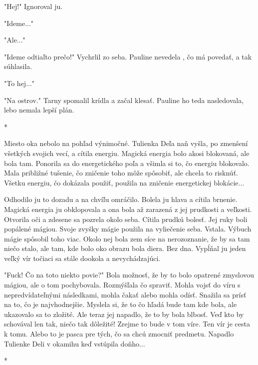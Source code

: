\documentclass{book}
\begin{document}
"$ $Hej!"$ $  Ignoroval ju.

"$ $Ideme..."$ $ 

"$ $Ale..."$ $ 

"$ $Ideme odtiaľto prečo!"$ $  Vychrlil zo seba. Pauline nevedela , čo má povedať, a tak súhlasila.

"$ $To hej..."$ $ 

"$ $Na ostrov."$ $  Tarny spomalil krídla a začal klesať. Pauline ho teda nasledovala, lebo nemala lepší plán.

\begin{center}

*

\end{center}

Miesto oka nebolo na pohľad výnimočné. Tulienka Deľa naň vyšla, po zmenšení všetkých svojich vecí, a cítila energiu. Magická energia bolo akosi blokovaná, ale bola tam. Ponorila sa do energetického poľa a všimla si to, čo energiu blokovalo. Mala približné tušenie, čo zničenie toho môže spôsobiť, ale chcela to risknúť. Všetku energiu, čo dokázala použiť, použila na zničenie energetickej blokácie...

Odhodilo ju to dozadu a na chvíľu omráčilo. Bolela ju hlava a cítila brnenie. Magická energia ju obklopovala a ona bola až zarazená z jej prudkosti a veľkosti. Otvorila oči a zdesene sa pozrela okolo seba. Cítila prudkú bolesť. Jej ruky boli popálené mágiou. Svoje zvyšky mágie použila na vyliečenie seba. Vstala. Výbuch mágie spôsobil toho viac. Okolo nej bola zem síce na nerozoznanie, že by sa tam niečo stalo, ale tam, kde bolo oko obrazu bola diera. Bez dna. Vypĺňal ju jeden veľký vír točiaci sa stále dookola a nevychádzajúci.

"$ $Fuck! Čo na toto niekto povie?"$ $  Bola možnosť, že by to bolo opatrené zmyslovou mágiou, ale o tom pochybovala. Rozmýšľala čo spraviť. Mohla vojsť do víru s nepredvídateľnými následkami, mohla čakať alebo mohla odísť. Snažila sa prísť na to, čo je najvhodnejšie. Myslela si, že to čo hľadá bude tam kde bola, ale ukazovalo sa to zložité. Ale teraz jej napadlo, že to by bola blbosť. Veď kto by schovával len tak, niečo tak dôležité! Zrejme to bude v tom víre. Ten vír je cesta k tomu. Alebo to je pasca pre tých, čo sa chcú zmocniť predmetu. Napadlo Tulienke Deli v okamihu keď vstúpila doňho...

\begin{center}

*

\end{center}
\end{document}
